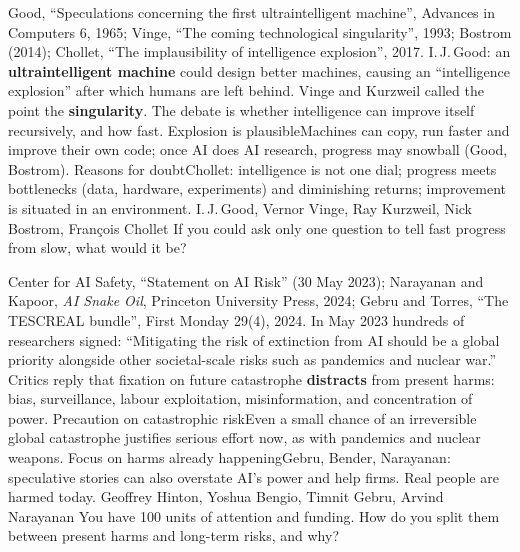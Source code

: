 {Good, ``Speculations concerning the first ultraintelligent machine'', Advances in Computers 6, 1965; Vinge, ``The coming technological singularity'', 1993; Bostrom (2014); Chollet, ``The implausibility of intelligence explosion'', 2017.}
{I.\,J.\,Good: an \textbf{ultraintelligent machine} could design better machines, causing an ``intelligence explosion'' after which humans are left behind. Vinge and Kurzweil called the point the \textbf{singularity}. The debate is whether intelligence can improve itself recursively, and how fast.}
{Explosion is plausible}{Machines can copy, run faster and improve their own code; once AI does AI research, progress may snowball (Good, Bostrom).}
{Reasons for doubt}{Chollet: intelligence is not one dial; progress meets bottlenecks (data, hardware, experiments) and diminishing returns; improvement is situated in an environment.}
{I.\,J.\,Good, Vernor Vinge, Ray Kurzweil, Nick Bostrom, Fran\c{c}ois Chollet}
{If you could ask only one question to tell fast progress from slow, what would it be?}

{Center for AI Safety, ``Statement on AI Risk'' (30 May 2023); Narayanan and Kapoor, \emph{AI Snake Oil}, Princeton University Press, 2024; Gebru and Torres, ``The TESCREAL bundle'', First Monday 29(4), 2024.}
{In May 2023 hundreds of researchers signed: ``Mitigating the risk of extinction from AI should be a global priority alongside other societal-scale risks such as pandemics and nuclear war.'' Critics reply that fixation on future catastrophe \textbf{distracts} from present harms: bias, surveillance, labour exploitation, misinformation, and concentration of power.}
{Precaution on catastrophic risk}{Even a small chance of an irreversible global catastrophe justifies serious effort now, as with pandemics and nuclear weapons.}
{Focus on harms already happening}{Gebru, Bender, Narayanan: speculative stories can also overstate AI's power and help firms. Real people are harmed today.}
{Geoffrey Hinton, Yoshua Bengio, Timnit Gebru, Arvind Narayanan}
{You have 100 units of attention and funding. How do you split them between present harms and long-term risks, and why?}

